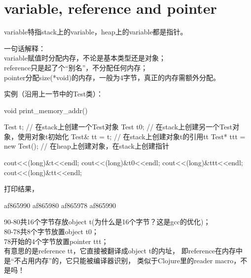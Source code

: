 \section[variable, reference and pointer]{variable, reference and pointer}
variable特指stack上的variable，heap上的variable都是指针。

一句话解释：\\
variable赋值时分配内存，不论是基本类型还是对象；\\
reference只是起了个“别名”，不分配任何内存；\\
pointer分配size(*void)的内存，一般为4字节，真正的内存需额外分配。

实例（沿用上一节中的Test类）：

\begin{cppcode}
void print_memory_addr() {
    Test t;   // 在stack上创建一个Test对象
    Test t0;  // 在stack上创建另一个Test对象，使用对象t初始化
    Test& tt = t; // 在stack上创建对象t的引用tt
    Test* ttt = new Test(); // 在heap上创建对象，在stack上创建指针

    cout<<(long)&t<<endl;
    cout<<(long)&t0<<endl;
    cout<<(long)&ttt<<endl;
    cout<<(long)&tt<<endl;
}
\end{cppcode}

打印结果，

\begin{bashcode}
af865990
af865980
af865978
af865990
\end{bashcode}

90-80共16个字节存放object t(为什么是16个字节？这是gcc的优化)；\\
80-78共8个字节放置object t0；\\
78开始的4个字节放置pointer ttt；\\
有意思的是reference tt，它直接被翻译成object t的内址，
即reference在内存中是“不占用内存”的，它只能被编译器识别，
类似于Clojure里的reader macro，不是吗！